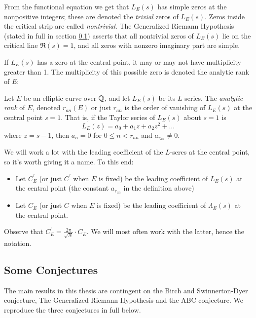 \documentclass[10pt]{article}
\newcommand{\pr}{^{\prime}}
\newcommand{\Les}{L_E(s)}
\newcommand{\Lams}{\Lambda_E(s)}
\begin{document}
From the functional equation we get that $\Les$ has simple zeros at the nonpositive integers; these are denoted the {\it trivial} zeros of $\Les$. Zeros inside the critical strip are called {\it nontrivial}. The Generalized Riemann Hypothesis (stated in full in section \ref{sec:conjectures}) asserts that all nontrivial zeros of $\Les$ lie on the critical line $\Re(s)=1$, and all zeros with nonzero imaginary part are simple. 

If $\Les$ has a zero at the central point, it may or may not have multiplicity greater than 1. The multiplicity of this possible zero is denoted the analytic rank of $E$:
\begin{definition}
Let $E$ be an elliptic curve over $\mathbb{Q}$, and let $\Les$ be its $L$-series. The {\it analytic rank} of $E$, denoted $r_{an}(E)$ or just $r_{an}$ is the order of vanishing of $L_E(s)$ at the central point $s=1$. That is, if the Taylor series of $\Les$ about $s=1$ is
\begin{equation}
L_E(z) = a_0 + a_1 z + a_2 z^2 + \ldots
\end{equation}
where $z = s-1$, then $a_n = 0$ for $0 \le n < r_{an}$ and $a_{r_{an}} \ne 0$.
\end{definition}
We will work a lot with the leading coefficient of the $L$-seres at the central point, so it's worth giving it a name. To this end:
\begin{definition} \mbox{}
\begin{itemize}
\item Let $C\pr_E$ (or just $C\pr$ when $E$ is fixed) be the leading coefficient of $L_E(s)$ at the central point (the constant $a_{r_{an}}$ in the definition above)
\item Let $C_E$ (or just $C$ when $E$ is fixed) be the leading coefficient of $\Lams$ at the central point.
\end{itemize}
\end{definition}
Observe that $C\pr_E = \frac{2\pi}{\sqrt{N}}\cdot C_E$. We will most often work with the latter, hence the notation.

\newpage
\subsection{Some Conjectures}\label{sec:conjectures}

The main results in this thesis are contingent on the Birch and Swinnerton-Dyer conjecture, The Generalized Riemann Hypothesis and the ABC conjecture. We reproduce the three conjectures in full below. \\
\end{document}

